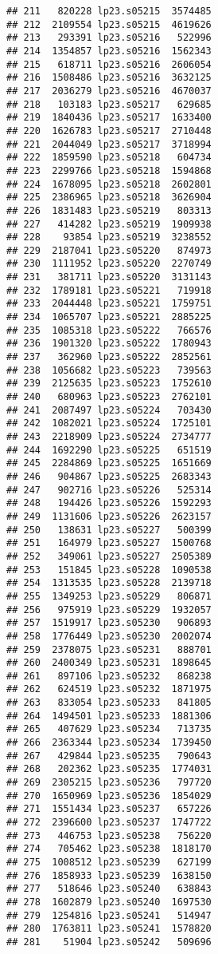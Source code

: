 \documentclass[
]{article}
\begin{document}
\begin{verbatim}
## 211   820228 lp23.s05215  3574485
## 212  2109554 lp23.s05215  4619626
## 213   293391 lp23.s05216   522996
## 214  1354857 lp23.s05216  1562343
## 215   618711 lp23.s05216  2606054
## 216  1508486 lp23.s05216  3632125
## 217  2036279 lp23.s05216  4670037
## 218   103183 lp23.s05217   629685
## 219  1840436 lp23.s05217  1633400
## 220  1626783 lp23.s05217  2710448
## 221  2044049 lp23.s05217  3718994
## 222  1859590 lp23.s05218   604734
## 223  2299766 lp23.s05218  1594868
## 224  1678095 lp23.s05218  2602801
## 225  2386965 lp23.s05218  3626904
## 226  1831483 lp23.s05219   803313
## 227   414282 lp23.s05219  1909938
## 228    93854 lp23.s05219  3238552
## 229  2187041 lp23.s05220   874973
## 230  1111952 lp23.s05220  2270749
## 231   381711 lp23.s05220  3131143
## 232  1789181 lp23.s05221   719918
## 233  2044448 lp23.s05221  1759751
## 234  1065707 lp23.s05221  2885225
## 235  1085318 lp23.s05222   766576
## 236  1901320 lp23.s05222  1780943
## 237   362960 lp23.s05222  2852561
## 238  1056682 lp23.s05223   739563
## 239  2125635 lp23.s05223  1752610
## 240   680963 lp23.s05223  2762101
## 241  2087497 lp23.s05224   703430
## 242  1082021 lp23.s05224  1725101
## 243  2218909 lp23.s05224  2734777
## 244  1692290 lp23.s05225   651519
## 245  2284869 lp23.s05225  1651669
## 246   904867 lp23.s05225  2683343
## 247   902716 lp23.s05226   525314
## 248   194426 lp23.s05226  1592293
## 249  1131606 lp23.s05226  2623157
## 250   138631 lp23.s05227   500399
## 251   164979 lp23.s05227  1500768
## 252   349061 lp23.s05227  2505389
## 253   151845 lp23.s05228  1090538
## 254  1313535 lp23.s05228  2139718
## 255  1349253 lp23.s05229   806871
## 256   975919 lp23.s05229  1932057
## 257  1519917 lp23.s05230   906893
## 258  1776449 lp23.s05230  2002074
## 259  2378075 lp23.s05231   888701
## 260  2400349 lp23.s05231  1898645
## 261   897106 lp23.s05232   868238
## 262   624519 lp23.s05232  1871975
## 263   833054 lp23.s05233   841805
## 264  1494501 lp23.s05233  1881306
## 265   407629 lp23.s05234   713735
## 266  2363344 lp23.s05234  1739450
## 267   429844 lp23.s05235   790643
## 268   202362 lp23.s05235  1774031
## 269  2305215 lp23.s05236   797720
## 270  1650969 lp23.s05236  1854029
## 271  1551434 lp23.s05237   657226
## 272  2396600 lp23.s05237  1747722
## 273   446753 lp23.s05238   756220
## 274   705462 lp23.s05238  1818170
## 275  1008512 lp23.s05239   627199
## 276  1858933 lp23.s05239  1638150
## 277   518646 lp23.s05240   638843
## 278  1602879 lp23.s05240  1697530
## 279  1254816 lp23.s05241   514947
## 280  1763811 lp23.s05241  1578820
## 281    51904 lp23.s05242   509696

\end{verbatim}
\end{document}
